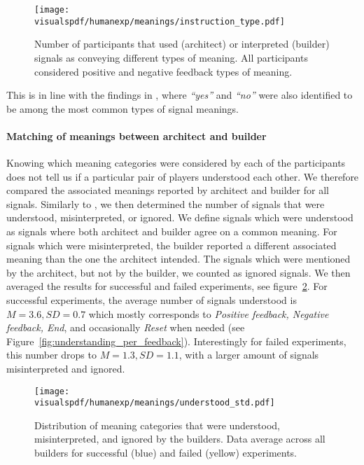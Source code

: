\begin{figure}[!htbp]
  \begin{center}
      \texttt{[image: \\visualspdf/humanexp/meanings/instruction\_type.pdf]}
      \caption{Number of participants that used (architect) or interpreted (builder) signals as conveying different types of meaning. All participants considered positive and negative feedback types of meaning.}
    \label{fig:types_of_feedback}
  \end{center}
\end{figure}

This is in line with the findings in \cite{griffiths2012bottom}, where \emph{``yes''} and \emph{``no''} were also identified to be among the most common types of signal meanings.

\paragraph{Matching of meanings between architect and builder} Knowing which meaning categories were considered by each of the participants does not tell us if a particular pair of players understood each other. We therefore compared the associated meanings reported by architect and builder for all signals. Similarly to \cite{griffiths2012bottom}, we then determined the number of signals that were understood, misinterpreted, or ignored. We define signals which were understood as signals where both architect and builder agree on a common meaning. For signals which were misinterpreted, the builder reported a different associated meaning than the one the architect intended. The signals which were mentioned by the architect, but not by the builder, we counted as ignored signals. We then averaged the results for successful and failed experiments, see figure~\ref{fig:types_of_understanding}. For successful experiments, the average number of signals understood is $M = 3.6, SD = 0.7$ which mostly corresponds to \emph{Positive feedback, Negative feedback, End}, and occasionally \emph{Reset} when needed (see Figure~\ref{fig:understanding_per_feedback}). Interestingly for failed experiments, this number drops to $M = 1.3, SD = 1.1$, with a larger amount of signals misinterpreted and ignored.

\begin{figure}[!htbp]
    \begin{center}
      \texttt{[image: \\visualspdf/humanexp/meanings/understood\_std.pdf]}
        \caption{Distribution of meaning categories that were understood, misinterpreted, and ignored by the builders. Data average across all builders for successful (blue) and failed (yellow) experiments.}
      \label{fig:types_of_understanding}
    \end{center}
\end{figure}

